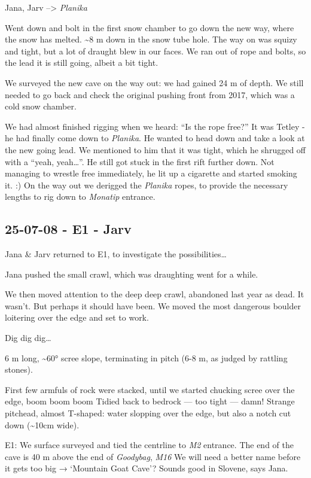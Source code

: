 Jana, Jarv --\textgreater{} \emph{Planika}

Went down and bolt in the first snow chamber to go down the new way,
where the snow has melted. \textasciitilde 8 m down in the snow tube
hole. The way on was squizy and tight, but a lot of draught blew in our
faces. We ran out of rope and bolts, so the lead it is still going,
albeit a bit tight.

We surveyed the new cave on the way out: we had gained 24 m of depth. We
still needed to go back and check the original pushing front from 2017,
which was a cold snow chamber.

We had almost finished rigging when we heard: ``Is the rope free?'' It
was Tetley - he had finally come down to \emph{Planika}. He wanted to
head down and take a look at the new going lead. We mentioned to him
that it was tight, which he shrugged off with a ``yeah, yeah\ldots{}''.
He still got stuck in the first rift further down. Not managing to
wrestle free immediately, he lit up a cigarette and started smoking it.
:) On the way out we derigged the \emph{Planika} ropes, to provide the
necessary lengths to rig down to \emph{Monatip} entrance.


\hypertarget{e1---jarv}{%
\subsection{25-07-08 - E1 - Jarv}\label{e1---jarv}}

Jana \& Jarv returned to E1, to investigate the possibilities\ldots{}

Jana pushed the small crawl, which was draughting went for a while.

We then moved attention to the deep deep crawl, abandoned last year as
dead. It wasn't. But perhaps it should have been. We moved the most
dangerous boulder loitering over the edge and set to work.

Dig dig dig\ldots{}

6 m long, \textasciitilde 60° scree slope, terminating in pitch (6-8 m,
as judged by rattling stones).

First few armfuls of rock were stacked, until we started chucking scree
over the edge, boom boom boom Tidied back to bedrock --- too tight ---
damn! Strange pitchead, almost T-shaped: water slopping over the edge,
but also a notch cut down (\textasciitilde10cm wide).

E1: We surface surveyed and tied the centrline to \emph{M2} entrance.
The end of the cave is 40 m above the end of \emph{Goodybag}, \emph{M16}
We will need a better name before it gets too big → `Mountain Goat
Cave'? Sounds good in Slovene, says Jana.

